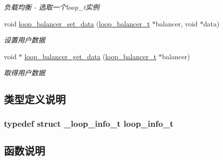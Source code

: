 \begin{DoxyCompactItemize}
\begin{DoxyCompactList}\small\item\em 负载均衡 -\/ 选取一个loop\+\_\+t实例 \end{DoxyCompactList}\item 
void \hyperlink{a00106_gae10d6df162c0c43fbfb2bb68cca09e8b_gae10d6df162c0c43fbfb2bb68cca09e8b}{loop\+\_\+balancer\+\_\+set\+\_\+data} (\hyperlink{a00051_a649c7e850ab247b5f70ad27e335a129d_a649c7e850ab247b5f70ad27e335a129d}{loop\+\_\+balancer\+\_\+t} $\ast$balancer, void $\ast$data)
\begin{DoxyCompactList}\small\item\em 设置用户数据 \end{DoxyCompactList}\item 
void $\ast$ \hyperlink{a00106_ga0f686f513ccb9026c58ab4675e5f87e2_ga0f686f513ccb9026c58ab4675e5f87e2}{loop\+\_\+balancer\+\_\+get\+\_\+data} (\hyperlink{a00051_a649c7e850ab247b5f70ad27e335a129d_a649c7e850ab247b5f70ad27e335a129d}{loop\+\_\+balancer\+\_\+t} $\ast$balancer)
\begin{DoxyCompactList}\small\item\em 取得用户数据 \end{DoxyCompactList}\end{DoxyCompactItemize}


\subsection{类型定义说明}
\hypertarget{a00072_a4ae76cfed863999ec747314b93b9287d_a4ae76cfed863999ec747314b93b9287d}{}
\subsubsection[{loop\+\_\+info\+\_\+t}]{\setlength{\rightskip}{0pt plus 5cm}typedef struct {\bf \+\_\+loop\+\_\+info\+\_\+t}  {\bf loop\+\_\+info\+\_\+t}}\label{a00072_a4ae76cfed863999ec747314b93b9287d_a4ae76cfed863999ec747314b93b9287d}


\subsection{函数说明}
\hypertarget{a00106_ga2b3cf2cb63d914efe226e901a50d8b0a_ga2b3cf2cb63d914efe226e901a50d8b0a}{}
